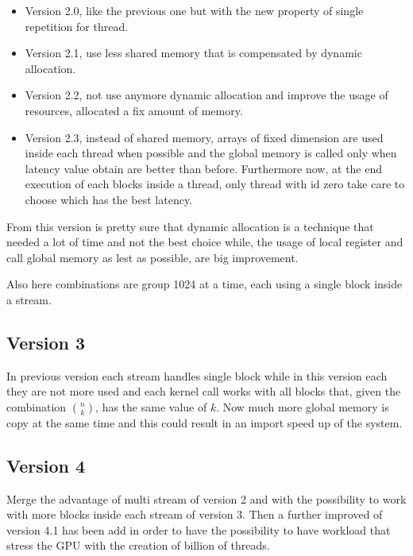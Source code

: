 \begin{itemize}
    \item Version 2.0, like the previous one but with the new property of single repetition for thread.
    
    \item Version 2.1, use less shared memory that is compensated by dynamic allocation.
    
    \item Version 2.2, not use anymore dynamic allocation and improve the usage of resources, allocated a fix amount of memory.
    
    \item Version 2.3, instead of shared memory, arrays of fixed dimension are used inside each thread when possible and the global memory is called only when latency value obtain are better than before. Furthermore now, at the end execution of each blocks inside a thread, only thread with id zero take care to choose which has the best latency. 
\end{itemize}

From this version is pretty sure that dynamic allocation is a technique that needed a lot of time and not the best choice while, the usage of local register and call global memory as lest as possible, are big improvement.

Also here combinations are group 1024 at a time, each using a single block inside a stream.

\subsection{Version 3}

In previous version each stream handles single block while in this version each they are not more used and each kernel call works with all blocks that, given the combination $\binom{n}{k}$, has the same value of $k$. Now much more global memory is copy at the same time and this could result in an import speed up of the system.

\subsection{Version 4}

Merge the advantage of multi stream of version 2 and with the possibility to work with more blocks inside each stream of version 3. Then a further improved of version 4.1 has been add in order to have the possibility to have workload that stress the GPU with the creation of billion of threads.